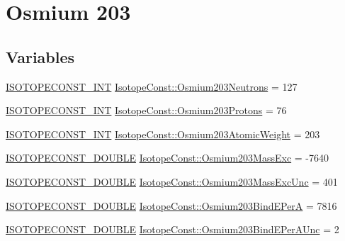 \hypertarget{group___isotope_const-_osmium-_os203}{}\section{Osmium 203}
\label{group___isotope_const-_osmium-_os203}
\subsection*{Variables}
\begin{DoxyCompactItemize}
\item 
\mbox{\hyperlink{group___isotope_const-_macros_ga5f18360b3e99483a35c32d789e62621c}{I\+S\+O\+T\+O\+P\+E\+C\+O\+N\+S\+T\+\_\+\+I\+NT}} \mbox{\hyperlink{group___isotope_const-_osmium-_os203_gaf874be89c007b94ab48ed2ab6232edcc}{Isotope\+Const\+::\+Osmium203\+Neutrons}} = 127
\item 
\mbox{\hyperlink{group___isotope_const-_macros_ga5f18360b3e99483a35c32d789e62621c}{I\+S\+O\+T\+O\+P\+E\+C\+O\+N\+S\+T\+\_\+\+I\+NT}} \mbox{\hyperlink{group___isotope_const-_osmium-_os203_gadec91ff7ba09c145a14780531ffbe921}{Isotope\+Const\+::\+Osmium203\+Protons}} = 76
\item 
\mbox{\hyperlink{group___isotope_const-_macros_ga5f18360b3e99483a35c32d789e62621c}{I\+S\+O\+T\+O\+P\+E\+C\+O\+N\+S\+T\+\_\+\+I\+NT}} \mbox{\hyperlink{group___isotope_const-_osmium-_os203_ga664f298f5b8b5d7513dc6c70eebc9fa4}{Isotope\+Const\+::\+Osmium203\+Atomic\+Weight}} = 203
\item 
\mbox{\hyperlink{group___isotope_const-_macros_ga8f45a7272ce02c0b4c65c44636ed719a}{I\+S\+O\+T\+O\+P\+E\+C\+O\+N\+S\+T\+\_\+\+D\+O\+U\+B\+LE}} \mbox{\hyperlink{group___isotope_const-_osmium-_os203_gab6285fabdf6f0d4c33cc91e473637404}{Isotope\+Const\+::\+Osmium203\+Mass\+Exc}} = -\/7640
\item 
\mbox{\hyperlink{group___isotope_const-_macros_ga8f45a7272ce02c0b4c65c44636ed719a}{I\+S\+O\+T\+O\+P\+E\+C\+O\+N\+S\+T\+\_\+\+D\+O\+U\+B\+LE}} \mbox{\hyperlink{group___isotope_const-_osmium-_os203_gacb95df13ed1ad42e6de452a88c6ce543}{Isotope\+Const\+::\+Osmium203\+Mass\+Exc\+Unc}} = 401
\item 
\mbox{\hyperlink{group___isotope_const-_macros_ga8f45a7272ce02c0b4c65c44636ed719a}{I\+S\+O\+T\+O\+P\+E\+C\+O\+N\+S\+T\+\_\+\+D\+O\+U\+B\+LE}} \mbox{\hyperlink{group___isotope_const-_osmium-_os203_gafa7d3682e9b466a6c3dd6be62c3f1786}{Isotope\+Const\+::\+Osmium203\+Bind\+E\+PerA}} = 7816
\item 
\mbox{\hyperlink{group___isotope_const-_macros_ga8f45a7272ce02c0b4c65c44636ed719a}{I\+S\+O\+T\+O\+P\+E\+C\+O\+N\+S\+T\+\_\+\+D\+O\+U\+B\+LE}} \mbox{\hyperlink{group___isotope_const-_osmium-_os203_ga9592977eba787eabb44dea6702861578}{Isotope\+Const\+::\+Osmium203\+Bind\+E\+Per\+A\+Unc}} = 2

\end{DoxyCompactItemize}

